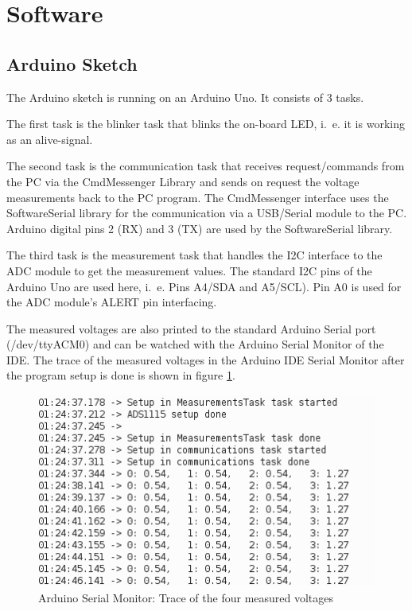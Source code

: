 \documentclass[11pt, oneside]{scrartcl}   	%
\begin{document}
\newpage
\section{Software}
\subsection{Arduino Sketch}
The Arduino sketch is running on an Arduino Uno. It consists of 3 tasks.

The first task is the blinker task that blinks the on-board LED, i.~e. it is working as an alive-signal.

The second task is the communication task that receives request/commands from the PC via the CmdMessenger Library and sends on request the voltage measurements
back to the PC program. The CmdMessenger interface uses the SoftwareSerial library for the communication via a USB/Serial module to the PC. 
Arduino digital pins 2 (RX) and 3 (TX) are used by the SoftwareSerial library.

The third task is the measurement task that handles the I2C interface to the ADC module to get the measurement values. The standard I2C pins of the Arduino Uno are used here, i.~e. Pins A4/SDA and A5/SCL). Pin A0 is used for the ADC module's ALERT pin interfacing.

The measured voltages are also printed to the standard Arduino Serial port (/dev/ttyACM0) and can be watched with the Arduino Serial Monitor of the IDE.
The trace of the measured voltages in the Arduino IDE Serial Monitor after the program setup is done is shown in figure \ref{fig:ArduinoSerialMonitorTrace}.
\begin{figure}[htbp]
	\centering
	\includegraphics[width=0.9\linewidth]{Figures/ArduinoSerialMonitorTrace.png}
	\caption[Arduino Serial Monitor: Trace of four measured voltages]{Arduino Serial Monitor: Trace of the four measured voltages}
	\label{fig:ArduinoSerialMonitorTrace}
\end{figure}
\end{document}

